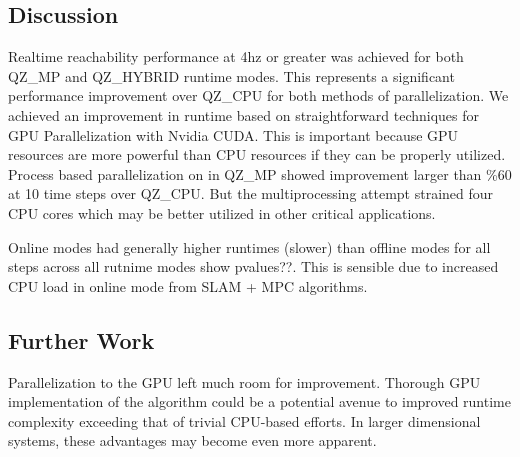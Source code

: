 \documentclass[runningheads]{llncs}
\begin{document}
\subsection{Discussion}

Realtime reachability performance at 4hz or greater was achieved for both QZ\_MP and QZ\_HYBRID runtime modes. This represents a significant performance improvement over QZ\_CPU for both methods of parallelization. We achieved an improvement in runtime based on straightforward techniques for GPU Parallelization with Nvidia CUDA. This is important because GPU resources are more powerful than CPU resources if they can be properly utilized. Process based parallelization on in QZ\_MP showed improvement larger than \%60 at 10 time steps over QZ\_CPU. But the multiprocessing attempt strained four CPU cores which may be better utilized in other critical applications.

Online modes had generally higher runtimes (slower) than offline modes for all steps across all rutnime modes show pvalues??. This is sensible due to increased CPU load in online mode from SLAM + MPC algorithms.

\subsection{Further Work}
Parallelization to the GPU left much room for improvement. Thorough GPU implementation of the algorithm could be a potential avenue to improved runtime complexity exceeding that of trivial CPU-based efforts. In larger dimensional systems, these advantages may become even more apparent.
\end{document}
